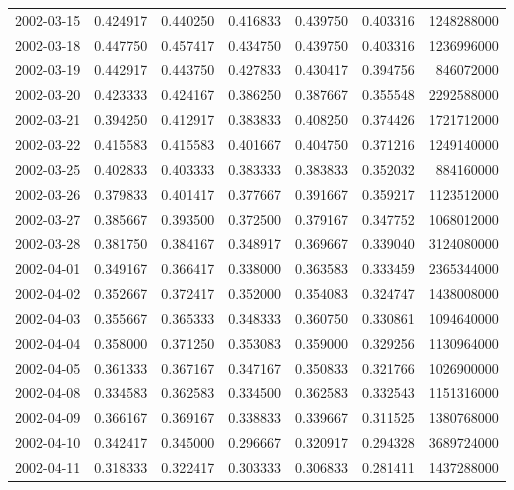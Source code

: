 \begin{tabular}{lrrrrrr}
2002-03-15 &    0.424917 &    0.440250 &    0.416833 &    0.439750 &    0.403316 &  1248288000 \\
2002-03-18 &    0.447750 &    0.457417 &    0.434750 &    0.439750 &    0.403316 &  1236996000 \\
2002-03-19 &    0.442917 &    0.443750 &    0.427833 &    0.430417 &    0.394756 &   846072000 \\
2002-03-20 &    0.423333 &    0.424167 &    0.386250 &    0.387667 &    0.355548 &  2292588000 \\
2002-03-21 &    0.394250 &    0.412917 &    0.383833 &    0.408250 &    0.374426 &  1721712000 \\
2002-03-22 &    0.415583 &    0.415583 &    0.401667 &    0.404750 &    0.371216 &  1249140000 \\
2002-03-25 &    0.402833 &    0.403333 &    0.383333 &    0.383833 &    0.352032 &   884160000 \\
2002-03-26 &    0.379833 &    0.401417 &    0.377667 &    0.391667 &    0.359217 &  1123512000 \\
2002-03-27 &    0.385667 &    0.393500 &    0.372500 &    0.379167 &    0.347752 &  1068012000 \\
2002-03-28 &    0.381750 &    0.384167 &    0.348917 &    0.369667 &    0.339040 &  3124080000 \\
2002-04-01 &    0.349167 &    0.366417 &    0.338000 &    0.363583 &    0.333459 &  2365344000 \\
2002-04-02 &    0.352667 &    0.372417 &    0.352000 &    0.354083 &    0.324747 &  1438008000 \\
2002-04-03 &    0.355667 &    0.365333 &    0.348333 &    0.360750 &    0.330861 &  1094640000 \\
2002-04-04 &    0.358000 &    0.371250 &    0.353083 &    0.359000 &    0.329256 &  1130964000 \\
2002-04-05 &    0.361333 &    0.367167 &    0.347167 &    0.350833 &    0.321766 &  1026900000 \\
2002-04-08 &    0.334583 &    0.362583 &    0.334500 &    0.362583 &    0.332543 &  1151316000 \\
2002-04-09 &    0.366167 &    0.369167 &    0.338833 &    0.339667 &    0.311525 &  1380768000 \\
2002-04-10 &    0.342417 &    0.345000 &    0.296667 &    0.320917 &    0.294328 &  3689724000 \\
2002-04-11 &    0.318333 &    0.322417 &    0.303333 &    0.306833 &    0.281411 &  1437288000 \\

\end{tabular}

